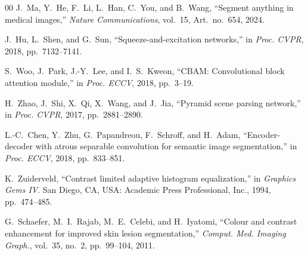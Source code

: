 \documentclass[conference]{IEEEtran}
\begin{document}
\begin{thebibliography}{00}
J.~Ma, Y.~He, F.~Li, L.~Han, C.~You, and B.~Wang,
``Segment anything in medical images,''
\textit{Nature Communications}, vol.~15, Art.~no.~654, 2024.

J.~Hu, L.~Shen, and G.~Sun,
``Squeeze-and-excitation networks,''
in \textit{Proc. CVPR}, 2018, pp.~7132--7141.

S.~Woo, J.~Park, J.-Y.~Lee, and I.~S.~Kweon,
``CBAM: Convolutional block attention module,''
in \textit{Proc. ECCV}, 2018, pp.~3--19.

H.~Zhao, J.~Shi, X.~Qi, X.~Wang, and J.~Jia,
``Pyramid scene parsing network,''
in \textit{Proc. CVPR}, 2017, pp.~2881--2890.

L.-C.~Chen, Y.~Zhu, G.~Papandreou, F.~Schroff, and H.~Adam,
``Encoder-decoder with atrous separable convolution for semantic image segmentation,''
in \textit{Proc. ECCV}, 2018, pp.~833--851.

K.~Zuiderveld,
``Contrast limited adaptive histogram equalization,''
in \textit{Graphics Gems IV}. San Diego, CA, USA: Academic Press Professional, Inc., 1994, pp.~474--485.

G.~Schaefer, M.~I.~Rajab, M.~E.~Celebi, and H.~Iyatomi,
``Colour and contrast enhancement for improved skin lesion segmentation,''
\textit{Comput. Med. Imaging Graph.}, vol.~35, no.~2, pp.~99--104, 2011.

\end{thebibliography}
\end{document}
